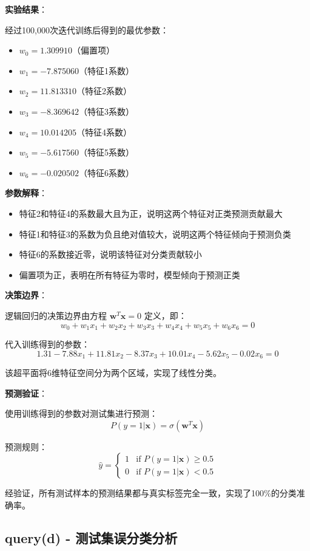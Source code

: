 \documentclass[a4paper]{article}
\begin{document}
\textbf{实验结果}：

经过100,000次迭代训练后得到的最优参数：
\begin{itemize}
    \item $w_0 = 1.309910$（偏置项）
    \item $w_1 = -7.875060$（特征1系数）
    \item $w_2 = 11.813310$（特征2系数）
    \item $w_3 = -8.369642$（特征3系数）
    \item $w_4 = 10.014205$（特征4系数）
    \item $w_5 = -5.617560$（特征5系数）
    \item $w_6 = -0.020502$（特征6系数）
\end{itemize}

\textbf{参数解释}：
\begin{itemize}
    \item 特征2和特征4的系数最大且为正，说明这两个特征对正类预测贡献最大
    \item 特征1和特征3的系数为负且绝对值较大，说明这两个特征倾向于预测负类
    \item 特征6的系数接近零，说明该特征对分类贡献较小
    \item 偏置项为正，表明在所有特征为零时，模型倾向于预测正类
\end{itemize}

\textbf{决策边界}：

逻辑回归的决策边界由方程 $\mathbf{w}^T \mathbf{x} = 0$ 定义，即：
$$w_0 + w_1 x_1 + w_2 x_2 + w_3 x_3 + w_4 x_4 + w_5 x_5 + w_6 x_6 = 0$$

代入训练得到的参数：
$$1.31 - 7.88x_1 + 11.81x_2 - 8.37x_3 + 10.01x_4 - 5.62x_5 - 0.02x_6 = 0$$

该超平面将6维特征空间分为两个区域，实现了线性分类。

\textbf{预测验证}：

使用训练得到的参数对测试集进行预测：
$$P(y=1|\mathbf{x}) = \sigma(\mathbf{w}^T \mathbf{x})$$

预测规则：
$$\hat{y} = \begin{cases} 1 & \text{if } P(y=1|\mathbf{x}) \geq 0.5 \\ 0 & \text{if } P(y=1|\mathbf{x}) < 0.5 \end{cases}$$

经验证，所有测试样本的预测结果都与真实标签完全一致，实现了100\%的分类准确率。

\subsection{query(d) - 测试集误分类分析}
\end{document}
